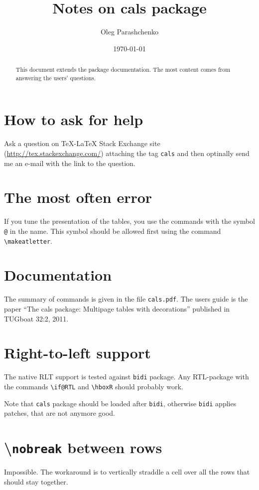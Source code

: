 \documentclass{article}
\begin{document}
\title{Notes on cals package}
\author{Oleg Parashchenko}
\date{\today}
\maketitle

\begin{abstract}This document extends the package documentation.
The most content comes from answering the users' questions.
\end{abstract}

\section{How to ask for help}
Ask a question on \TeX-\LaTeX{} Stack Exchange site
(\url{http://tex.stackexchange.com/}) attaching the tag
\verb|cals| and then optinally send me an e-mail with the
link to the question.

\section{The most often error}
If you tune the presentation of the tables, you use the commands
with the symbol \verb|@| in the name. This symbol should be
allowed first using the command \verb|\makeatletter|.

\section{Documentation}
The summary of commands is given in the file \verb|cals.pdf|.
The users guide is the paper ``The cals package: Multipage
tables with decorations'' published in TUGboat 32:2, 2011.

\section{Right-to-left support}
The native RLT support is tested against \verb|bidi| package.
Any RTL-package with the commands \verb|\if@RTL| and
\verb|\hboxR| should probably work.

Note that \verb|cals| package should be loaded after \verb|bidi|,
otherwise \verb|bidi| applies patches, that are not anymore good.

\section{\textbackslash\texttt{nobreak} between rows}
Impossible. The workaround is to vertically straddle a cell
over all the rows that should stay together.
\end{document}
